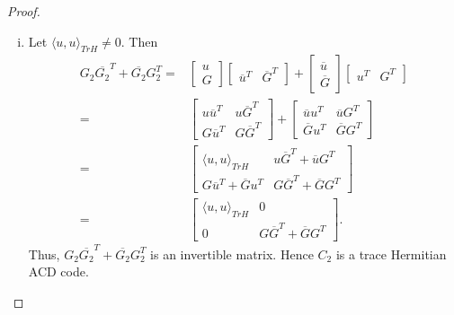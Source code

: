 \documentclass[10pt,a4paper]{amsart}
\begin{document}
\begin{proof}
\begin{enumerate}[(i)]
		Thus, $G_1 \overline{G_1}^T+\overline{G_1}G_1^T$
		is an invertible matrix. Hence $C_1$ is a trace Hermitian ACD code.	
		
		\item Let $\langle u,u\rangle_{TrH}\neq 0.$ Then 
		\begin{align*}
			G_2 \overline{G_2}^T+\overline{G_2}G_2^T=&\begin{bmatrix}
				u\\
				G
			\end{bmatrix}
			\begin{bmatrix}
				\overline{u}^T & \overline{G}^T
			\end{bmatrix}+\begin{bmatrix}
				\overline{u}\\
				\overline{G}
			\end{bmatrix}
			\begin{bmatrix}
				u^T & G^T
			\end{bmatrix}\\
			=&\begin{bmatrix}
				u\overline{u}^T & u\overline{G}^T\\
				G\overline{u}^T & G\overline{G}^T
			\end{bmatrix}+
			\begin{bmatrix}
				\overline{u}u^T &\overline{u}G^T \\
				\overline{G}u^T & \overline{G}G^T
			\end{bmatrix}\\
			=&\begin{bmatrix}
				\langle u,u\rangle_{TrH} & u\overline{G}^T+\overline{u}G^T \\
				G\overline{u}^T+\overline{G}u^T &G\overline{G}^T+ \overline{G}G^T
			\end{bmatrix}\\
			=&\begin{bmatrix}
				\langle u,u\rangle_{TrH} & 0\\
				0 &G\overline{G}^T+ \overline{G}G^T
			\end{bmatrix}.	
		\end{align*}
		Thus, $G_2 \overline{G_2}^T+\overline{G_2}G_2^T$ is an invertible matrix. Hence $C_2$ is a trace Hermitian ACD code.
	\end{enumerate}	
\end{proof}
\end{document}
